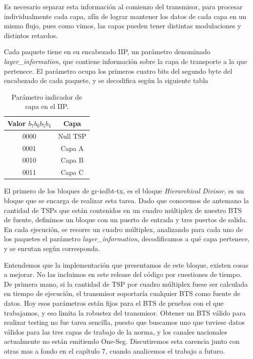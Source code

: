 Es necesario separar esta información al comienzo del transmisor, para procesar individualmente cada capa, afín de lograr mantener los datos de cada capa en un mismo flujo, pues como vimos, las capas pueden tener distintas modulaciones y distintos retardos. 

Cada paquete tiene en su encabezado \gls{IIP}, un parámetro denominado \textit{layer\_information}, que contiene información sobre la capa de transporte a la que pertenece. El parámetro ocupa los primeros cuatro bits del segundo byte del encabezado de cada paquete, y se decodifica según la siguiente tabla

\begin{table}[h!]
	\centering
	\begin{tabular}{|c|c|}
		\hline
		\textbf{Valor $b_{7}b_{6}b_{5}b_{4}$} & \textbf{Capa}\\
		\hline
		0000 		& Null TSP\\
		\hline
		0001 		& Capa A\\
		\hline
		0010 		& Capa B\\
		\hline
		0011 		& Capa C\\
		\hline
	\end{tabular}
	\caption{\label{Identificador de capa para TSP} Par\'ametro indicador de capa en el IIP.}
\end{table}

El primero de los bloques de gr-isdbt-tx, es el bloque \textit{Hierarchical Divisor}, es un bloque que se encarga de realizar esta tarea. Dado que conocemos de antemano la cantidad de TSPs que están contenidos en un cuadro múltiplex de nuestro BTS de fuente, definimos un bloque con un puerto de entrada y tres puertos de salida. En cada ejecución, se recorre un cuadro múltiplex, analizando para cada uno de los paquetes el parámetro \textit{layer\_information}, decodificamos a qué capa pertenece, y se enrutan según corresponda. 

Entendemos que la implementación que presentamos de este bloque, existen cosas a mejorar. No las incluimos en este release del código por cuestiones de tiempo. De primera mano, si la cantidad de TSP por cuadro múltiplex fuese ser calculada en tiempo de ejecución, el transmisor soportaría cualquier BTS como fuente de datos. Hoy esos parámetros están fijos para el BTS de pruebas con el que trabajamos, y eso limita la robustez del transmisor. Obtener un BTS válido para realizar testing no fue tarea sencilla, puesto que buscamos uno que tuviese datos válidos para las tres capas de trabajo de la norma, y los canales nacionales actualmente no están emitiendo One-Seg. Discutiremos esta carencia junto con otras mas a fondo en el capítulo 7, cuando analicemos el trabajo a futuro.

